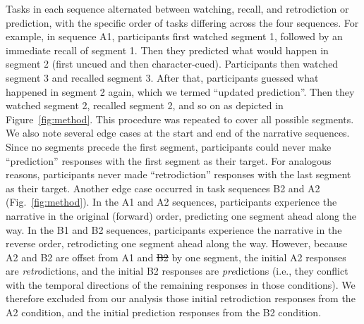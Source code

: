 \documentclass[10pt]{article}
\providecommand{\DIFaddtex}[1]{{\protect\color{blue}\uwave{#1}}} %
\providecommand{\DIFdeltex}[1]{{\protect\color{red}\sout{#1}}}                      %
\providecommand{\DIFaddbegin}{} %
\providecommand{\DIFaddend}{} %
\providecommand{\DIFdelbegin}{} %
\providecommand{\DIFdelend}{} %
\providecommand{\DIFadd}[1]{\texorpdfstring{\DIFaddtex{#1}}{#1}} %
\providecommand{\DIFdel}[1]{\texorpdfstring{\DIFdeltex{#1}}{}} %
\newcommand{\DIFscaledelfig}{0.5}
\newlength{\DIFdelgraphicswidth} %
\newlength{\DIFdelgraphicsheight} %
\newcommand{\DIFaddincludegraphics}[2][]{{\color{blue}\fbox{\DIFOincludegraphics[#1]{#2}}}} %
\newcommand{\DIFdelincludegraphics}[2][]{%
\sbox{\DIFdelgraphicsbox}{\DIFOincludegraphics[#1]{#2}}%
\settoboxwidth{\DIFdelgraphicswidth}{\DIFdelgraphicsbox} %
\settoboxtotalheight{\DIFdelgraphicsheight}{\DIFdelgraphicsbox} %
\scalebox{\DIFscaledelfig}{%
\parbox[b]{\DIFdelgraphicswidth}{\usebox{\DIFdelgraphicsbox}\\[-\baselineskip] \rule{\DIFdelgraphicswidth}{0em}}\llap{\resizebox{\DIFdelgraphicswidth}{\DIFdelgraphicsheight}{%
\setlength{\unitlength}{\DIFdelgraphicswidth}%
\begin{picture}(1,1)%
\thicklines\linethickness{2pt} %
{\color[rgb]{1,0,0}\put(0,0){\framebox(1,1){}}}%
{\color[rgb]{1,0,0}\put(0,0){\line( 1,1){1}}}%
{\color[rgb]{1,0,0}\put(0,1){\line(1,-1){1}}}%
\end{picture}%
}\hspace*{3pt}}} %
} %
\DeclareRobustCommand{\DIFaddbegin}{\DIFOaddbegin \let\includegraphics\DIFaddincludegraphics} %
\DeclareRobustCommand{\DIFaddend}{\DIFOaddend \let\includegraphics\DIFOincludegraphics} %
\DeclareRobustCommand{\DIFdelbegin}{\DIFOdelbegin \let\includegraphics\DIFdelincludegraphics} %
\DeclareRobustCommand{\DIFdelend}{\DIFOaddend \let\includegraphics\DIFOincludegraphics} %
\begin{document}
Tasks in each sequence alternated between watching, recall, and retrodiction or prediction, with the specific order of tasks differing across the four sequences. For example, in sequence A1, participants first watched segment 1, followed by an immediate recall of segment 1. Then they predicted what would happen in segment 2 (first uncued and then character-cued). Participants then watched segment 3 and recalled segment 3. After that, participants guessed what happened in segment 2 again, which we termed ``updated prediction''. Then they watched segment 2, recalled segment 2, and so on as depicted in Figure~\ref{fig:method}. This procedure was repeated to cover all possible segments. We also note several edge cases at the start and end of the narrative sequences. Since no segments precede the first segment, participants could never make ``prediction'' responses with the first segment as their target. For analogous reasons, participants never made ``retrodiction'' responses with the last segment as their target. Another edge case occurred in task sequences B2 and A2 (Fig.~\ref{fig:method}). In the A1 and A2 sequences, participants experience the narrative in the original (forward) order, predicting one segment ahead along the way. In the B1 and B2 sequences, participants experience the narrative in the reverse order, retrodicting one segment ahead along the way. However, because A2 and B2 are offset from A1 and \DIFdelbegin \DIFdel{B2 }\DIFdelend \DIFaddbegin \DIFadd{B1 }\DIFaddend by one segment, the initial A2 responses are \textit{retro}dictions, and the initial B2 responses are \textit{pre}dictions (i.e., they conflict with the temporal directions of the remaining responses in those conditions). We therefore excluded from our analysis those initial retrodiction responses from the A2 condition, and the initial prediction responses from the B2 condition.
\end{document}
